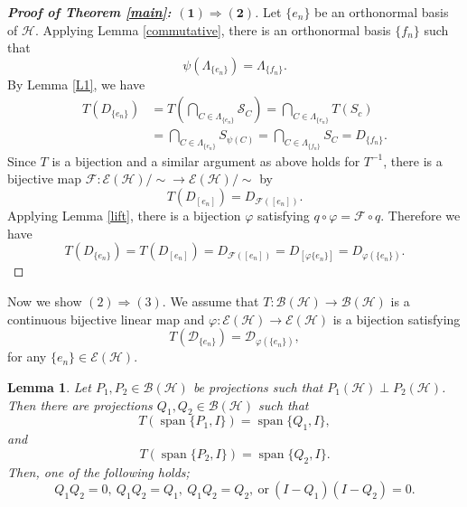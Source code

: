 \documentclass[11pt]{amsart}
\newtheorem{lemma}[theorem]{Lemma}
\theoremstyle{remark}
\newcommand{\BH}{\mathcal{B(H)}}
\newcommand{\cH}{{\mathcal{H}}}
\newcommand{\Span}{\operatorname{span}}
\begin{document}
\begin{proof}[{\textbf {Proof of Theorem \ref{main}: $\bm{(1) \Rightarrow (2)}$}}] 
Let $\{e_n\}$ be an orthonormal basis of $\cH$. Applying Lemma \ref{commutative}, there is an orthonormal basis $\{f_n\}$ such that 
 \[
 \psi(\Lambda_{\{e_n\}})=\Lambda_{\{f_n\}}.
 \]
By Lemma \ref{L1},  we have 
 \begin{equation*}
 \begin{split}
      T(D_{\{e_n\}})&=T(\bigcap_{C \in \Lambda_{\{e_n\}}} \mathcal{S}_{C})=\bigcap_{C \in \Lambda_{\{e_n\}}} T(S_c)\\&=\bigcap_{C \in \Lambda_{\{e_n\}}} S_{\psi(C)}=\bigcap_{C \in \Lambda_{\{f_n\}}} S_C=D_{\{f_n\}}.
 \end{split}
 \end{equation*}
Since $T$ is a bijection and a similar argument as above holds for $T^{-1}$, there is a bijective map $\mathcal{F}:\mathcal{E}(\cH)/ \sim  \to \mathcal{E}(\cH)/ \sim $ by 
\[
T(D_{[e_n]})=D_{\mathcal{F}([e_n])}.
\]
Applying Lemma \ref{lift}, there is  a bijection $\varphi$ satisfying $q\circ \varphi=\mathcal{F} \circ q$. Therefore we have
\[
T(D_{\{e_n\}})=T(D_{[e_n]})=D_{\mathcal{F}([e_n])}=D_{[\varphi\{e_n\}]}=D_{\varphi(\{e_n\})}.
\] 
\end{proof}

Now we show $(2)\Rightarrow(3)$. We assume that $T: \BH \to \BH$ is a continuous bijective linear map  and $\varphi: \mathcal{E}(\cH) \to \mathcal{E}(\cH)$ is a bijection satisfying 
\[
T(\mathcal{D}_{\{e_n\}}) = \mathcal{D}_{\varphi(\{e_n\})},
\] 
for any $\{e_n\} \in \mathcal{E}(\cH)$. 

\begin{lemma}\label{projection1}
Let $P_1, P_2 \in \BH $ be projections such that $P_1(\cH) \perp P_2(\cH)$. 
Then there are projections $Q_1, Q_2 \in \BH$
such that 
\[
T(\Span \{P_1, I\} )=\Span \{Q_1,I\},
\]
 and 
\[
T(\Span \{P_2, I\} )=\Span \{Q_2,I\}.
\]
Then, one of the following holds;
\[
Q_1Q_2=0, \ Q_1Q_2=Q_1, \ Q_1Q_2=Q_2, \ \text{or} \ (I-Q_1)(I-Q_2)=0.
\]
\end{lemma}
\end{document}
